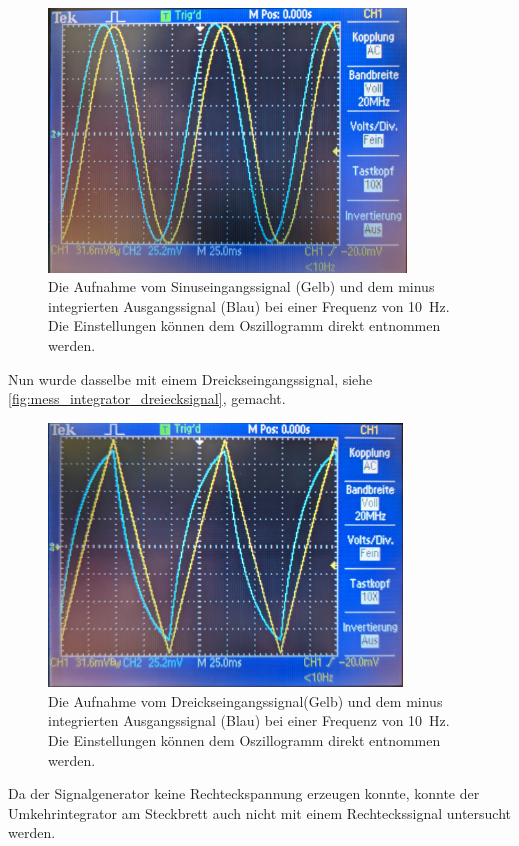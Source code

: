 \documentclass[12pt,english,ngerman]{scrartcl}
\begin{document}
\begin{figure}[H]
  \centering
    \includegraphics[width=\linewidth, height=7cm]{./figures/integrator/sinussignal.jpg}
  \caption{Die Aufnahme vom Sinuseingangssignal (Gelb) und dem minus integrierten
  Ausgangssignal (Blau) bei einer Frequenz von \SI{10}{\hertz}. Die
  Einstellungen können dem Oszillogramm direkt entnommen werden.}
  \label{fig:mess_integrator_sinussignal}
\end{figure}

Nun wurde dasselbe mit einem Dreickseingangssignal,
siehe \autoref{fig:mess_integrator_dreiecksignal}, gemacht.

\begin{figure}[H]
  \centering
    \includegraphics[width=\linewidth, height=7cm]{./figures/integrator/dreiecksignal.jpg}
  \caption{Die Aufnahme vom Dreickseingangssignal(Gelb) und dem minus integrierten
  Ausgangssignal (Blau) bei einer Frequenz von \SI{10}{\hertz}. Die
  Einstellungen können dem Oszillogramm direkt entnommen werden.}
  \label{fig:mess_integrator_dreiecksignal}
\end{figure}

Da der Signalgenerator \cite{funktionsgenerator} keine Rechteckspannung erzeugen konnte, konnte
der Umkehrintegrator am Steckbrett auch nicht mit einem Rechteckssignal untersucht werden.
\end{document}
